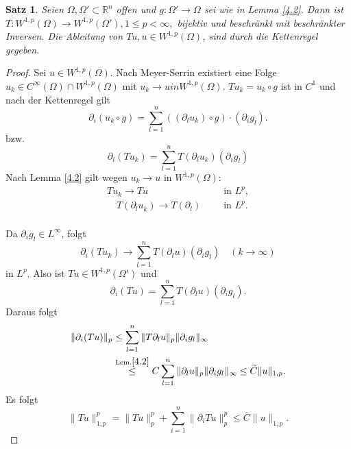 \documentclass[
paper=a4,
bibtotocnumbered,
liststotocnumbered,
tablecaptionabove,
pointlessnumbers,
twoside,
openright,
10pt
]
{report}
\newtheorem{satz}[thm]{Satz}
\theoremstyle{definition}
\numberwithin{equation}{chapter}
\begin{document}
\begin{satz}
 Seien $\Omega, \Omega'\subset \mathbb R^n$ offen und $g: \Omega'\to \Omega$ sei wie in Lemma \ref{4.2}. 
 Dann ist $T: W^{1,p}(\Omega) \to W^{1,p}(\Omega'), 1\le p <\infty,$ bijektiv und beschränkt mit 
 beschränkter Inversen. Die Ableitung von $Tu, u \in W^{1,p}(\Omega)$, sind durch die Kettenregel gegeben.
\end{satz}
\begin{proof}
 Sei $u\in W^{1,p}(\Omega)$. Nach Meyer-Serrin existiert eine Folge $u_k \in C^\infty(\Omega) \cap W^{1,p}(\Omega)$ mit $u_k \to u in W^{1,p}(\Omega)$. 
 $Tu_k=u_k \circ g$ ist in $C^1$ und nach der Kettenregel gilt
 \begin{equation}
  \partial_i (u_k \circ g) = \sum_{l=1}^n ((\partial_l u_k)\circ g)\cdot(\partial_i g_l).
 \end{equation}
 bzw.
 \begin{equation}\label{eq:4.1}
  \partial_i (Tu_k) = \sum_{l=1}^n T(\partial_l u_k) (\partial_i g_l)
 \end{equation}
Nach Lemma \eqref{4.2} gilt wegen $u_k \to u$ in $W^{1,p}(\Omega)$:
\begin{align}
 T u_k \to Tu &\ \quad \text{ in } L^p, \label{eq:4.2} \\ \quad T(\partial_l u_k) \to T(\partial_l) &\ \quad \text{ in } L^p. \label{eq:4.3}
\end{align}
\ 
\\
Da $\partial_i g_l \in L^\infty$, folgt 
\begin{equation}
 \partial_i(Tu_k) \to \sum_{l=1}^n T(\partial_l u) ( \partial_i g_l) \quad ( k\to \infty)
\end{equation}
in $L^p$. Also ist $Tu\in W^{1,p}(\Omega')$ und 
\begin{equation}
 \partial_i(Tu) = \sum_{l=1}^n T(\partial_l u) (\partial_i g_l).
\end{equation}
Daraus folgt
\begin{align*}
 \|\partial_i(Tu)\|_p &\le \sum_{l=1}^n \|T\partial_l u \|_p \| \partial_i g_l\|_\infty\\
 &\stackrel{\text{Lem.} \ref{4.2}}\le C \sum_{l=1}^n \| \partial_l u\|_p \| \partial_i g_l\|_\infty \le \widetilde C \|u\|_{1,p}.
\end{align*}
Es folgt
\begin{equation}
 \|Tu\|_{1,p}^p = \|Tu\|_p^p + \sum_{i=1}^n \| \partial_i Tu\|_p^p \le \overline C \|u\|_{1,p}.
\end{equation}
\end{proof}
\end{document}
